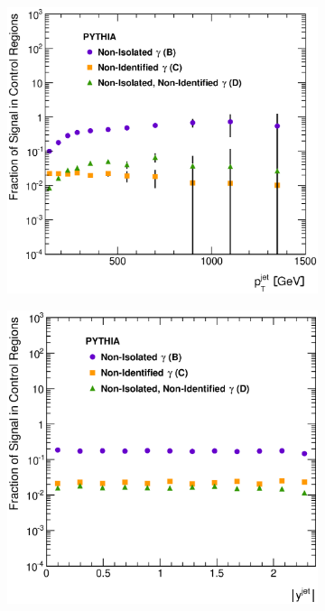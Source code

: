 \documentclass[12pt, twoside]{article}
\numberwithin{equation}{section}
\numberwithin{figure}{section}
\newenvironment{changemargin}[2]{%
\begin{list}{}{%
\setlength{\topsep}{0pt}%
\setlength{\leftmargin}{#1}%
\setlength{\rightmargin}{#2}%
\setlength{\listparindent}{\parindent}%
\setlength{\itemindent}{\parindent}%
\setlength{\parsep}{\parskip}%
}%
\item[]}{\end{list}}
\begin{document}
\begin{figure}
\begin{changemargin}{-1.0cm}{-0.75cm}
\begin{changemargin}{-0.75cm}{-1.0cm}
        \vspace{0.2cm}
        \begin{subfigure}[b]{0.37\textwidth}
            \includegraphics[width=\textwidth]{./images/SignalLeakageFractionsPythia/SLF-104.eps}
            \subcaption{}
            \label{fig:SLFPtJet}
        \end{subfigure}
        \begin{subfigure}[b]{0.37\textwidth}
            \includegraphics[width=\textwidth]{./images/SignalLeakageFractionsPythia/SLF-105.eps}

\end{subfigure}
\end{changemargin}
\end{changemargin}
\end{figure}
\end{document}
